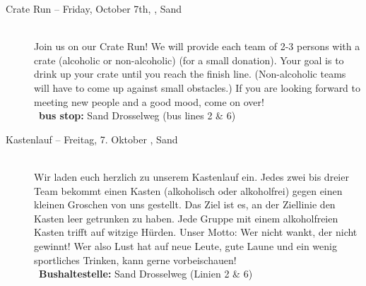 \begin{description}
\ifml
	\item[Crate Run -- Friday, October 7th, \YEAR, Sand]~\\
	Join us on our Crate Run! We will provide each team of 2-3 persons with a crate (alcoholic or non-alcoholic) (for a small donation).
	Your goal is to drink up your crate until you reach the finish line. (Non-alcoholic teams will have to come up against small obstacles.)
	If you are looking forward to meeting new people and a good mood, come on over! \\
	~\textbf{bus stop:} Sand Drosselweg (bus lines 2 \& 6)
\else
	\item[Kastenlauf -- Freitag, 7. Oktober \YEAR, Sand]~\\ %
	Wir laden euch herzlich zu unserem Kastenlauf ein.
	Jedes zwei bis dreier Team bekommt einen Kasten (alkoholisch oder alkoholfrei) gegen einen kleinen Groschen von uns gestellt. 
	Das Ziel ist es, an der Ziellinie den Kasten leer getrunken zu haben.
	Jede Gruppe mit einem alkoholfreien Kasten trifft auf witzige Hürden.
	Unser Motto: Wer nicht wankt, der nicht gewinnt! Wer also Lust hat auf neue Leute, gute Laune und ein wenig sportliches Trinken, kann gerne vorbeischauen! \\
	~\textbf{Bushaltestelle:} Sand Drosselweg (Linien 2 \& 6)
\fi

\ifbinfo \ifmaster \pagebreak \fi \fi



\end{description}
